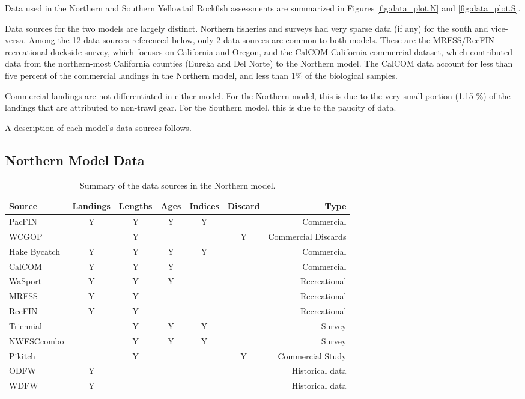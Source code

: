 \documentclass[12pt,]{article}
\begin{document}
Data used in the Northern and Southern Yellowtail Rockfish assessments
are summarized in Figures \ref{fig:data_plot.N} and
\ref{fig:data_plot.S}.

Data sources for the two models are largely distinct. Northern fisheries
and surveys had very sparse data (if any) for the south and vice-versa.
Among the 12 data sources referenced below, only 2 data sources are
common to both models. These are the MRFSS/RecFIN recreational dockside
survey, which focuses on California and Oregon, and the CalCOM
California commercial dataset, which contributed data from the
northern-most California counties (Eureka and Del Norte) to the Northern
model. The CalCOM data account for less than five percent of the
commercial landings in the Northern model, and less than 1\% of the
biological samples.

Commercial landings are not differentiated in either model. For the
Northern model, this is due to the very small portion (1.15 \%) of the
landings that are attributed to non-trawl gear. For the Southern model,
this is due to the paucity of data.

A description of each model's data sources follows.

\subsection{Northern Model Data}\label{northern-model-data}

\vspace{.5cm}

\begin{table}[ht]
\centering
\caption{Summary of the data sources in the Northern model.} 
\label{tab:Data_sources}
\begin{tabular}{lcccccr}
  \hline
Source & Landings & Lengths & Ages & Indices & Discard & Type \\ 
  \hline
PacFIN & Y & Y & Y & Y &  & Commercial \\ 
  WCGOP &  & Y &  &  & Y & Commercial Discards \\ 
  Hake Bycatch & Y & Y & Y & Y &  & Commercial \\ 
  CalCOM & Y & Y & Y &  &  & Commercial \\ 
  WaSport & Y & Y & Y &  &  & Recreational \\ 
  MRFSS & Y & Y &  &  &  & Recreational \\ 
  RecFIN & Y & Y &  &  &  & Recreational \\ 
  Triennial &  & Y & Y & Y &  & Survey \\ 
  NWFSCcombo &  & Y & Y & Y &  & Survey \\ 
  Pikitch &  & Y &  &  & Y & Commercial Study \\ 
  ODFW & Y &  &  &  &  & Historical data \\ 
  WDFW & Y &  &  &  &  & Historical data \\ 
   \hline
\end{tabular}
\end{table}
\end{document}
